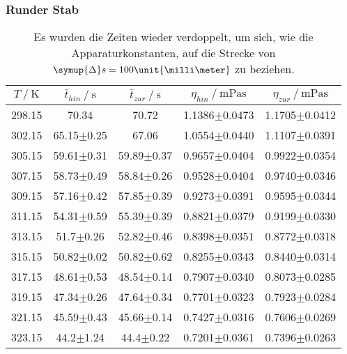\subsubsection{Runder Stab}
\label{sec:Runder Stab}

\begin{table}[H]
  \centering
  \caption{Es wurden die Zeiten wieder verdoppelt, um sich, wie die Apparaturkonstanten, auf die Strecke 
  von $\symup{\Delta}s=100\unit{\milli\meter}$ zu beziehen.}
  \begin{tabular}{ccccc}
    \toprule
    {$T \mathbin{/} \unit{\kelvin}$} &
    {$\bar{t}_{hin} \mathbin{/} \unit{\second}$} &
    {$\bar{t}_{zur} \mathbin{/} \unit{\second}$} &
    {$\eta_{hin} \mathbin{/} \unit{\milli\pascal\second}$} &
    {$\eta_{zur} \mathbin{/} \unit{\milli\pascal\second}$} \\
    \midrule
    298.15 & 70.34          & 70.72          & 1.1386$\pm$0.0473 & 1.1705$\pm$0.0412 \\
    302.15 & 65.15$\pm$0.25 & 67.06          & 1.0554$\pm$0.0440 & 1.1107$\pm$0.0391 \\
    305.15 & 59.61$\pm$0.31 & 59.89$\pm$0.37 & 0.9657$\pm$0.0404 & 0.9922$\pm$0.0354 \\
    307.15 & 58.73$\pm$0.49 & 58.84$\pm$0.26 & 0.9528$\pm$0.0404 & 0.9740$\pm$0.0346 \\
    309.15 & 57.16$\pm$0.42 & 57.85$\pm$0.39 & 0.9273$\pm$0.0391 & 0.9595$\pm$0.0344 \\
    311.15 & 54.31$\pm$0.59 & 55.39$\pm$0.39 & 0.8821$\pm$0.0379 & 0.9199$\pm$0.0330 \\
    313.15 & 51.7$\pm$0.26  & 52.82$\pm$0.46 & 0.8398$\pm$0.0351 & 0.8772$\pm$0.0318 \\
    315.15 & 50.82$\pm$0.02 & 50.82$\pm$0.62 & 0.8255$\pm$0.0343 & 0.8440$\pm$0.0314 \\
    317.15 & 48.61$\pm$0.53 & 48.54$\pm$0.14 & 0.7907$\pm$0.0340 & 0.8073$\pm$0.0285 \\
    319.15 & 47.34$\pm$0.26 & 47.64$\pm$0.34 & 0.7701$\pm$0.0323 & 0.7923$\pm$0.0284 \\
    321.15 & 45.59$\pm$0.43 & 45.66$\pm$0.14 & 0.7427$\pm$0.0316 & 0.7606$\pm$0.0269 \\
    323.15 & 44.2$\pm$1.24  & 44.4$\pm$0.22  & 0.7201$\pm$0.0361 & 0.7396$\pm$0.0263 \\
    \bottomrule
  \end{tabular}
  \label{tab:Tabelle1}
\end{table}

